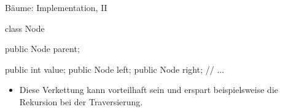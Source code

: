 \begin{frame}[fragile]{Bäume: Implementation, II}
    \pause\begin{minipage}{.4\linewidth}
\small%
\begin{plainjava}
class Node {
    public Node parent;

    public int value;
    public Node left;
    public Node right;
    // ...
}
\end{plainjava}
    \end{minipage}\hfill{}\pause\begin{minipage}{.55\linewidth}%
\centering{}
\end{minipage}\vfill
    \begin{itemize}[<+(1)->]
        \widei
        \item Diese Verkettung kann vorteilhaft sein und erspart beispielsweise die Rekursion bei der Traversierung.
    \end{itemize}
\end{frame}

